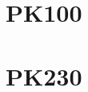 \documentclass{report}
\begin{document}
\newpage
\section{PK100}


\newpage
\section{PK230}


% 

%
% 
% 
% 
% 
% 
% 
% 
% 
\end{document}
